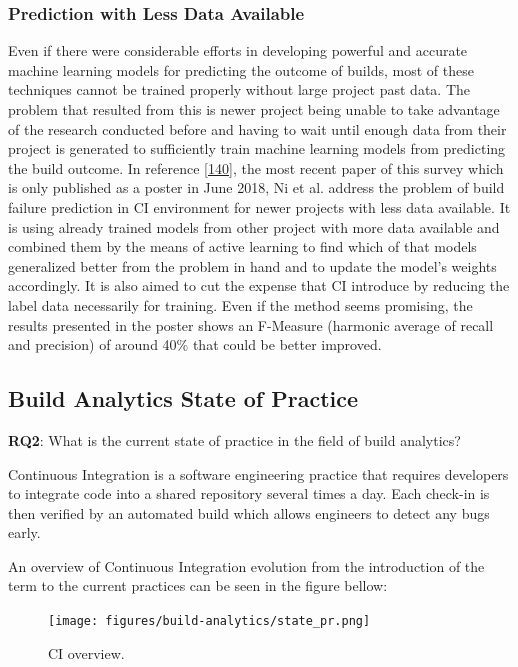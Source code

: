 \documentclass[]{book}
\begin{document}
\subsubsection{Prediction with Less Data
Available}\label{prediction-with-less-data-available}

Even if there were considerable efforts in developing powerful and
accurate machine learning models for predicting the outcome of builds,
most of these techniques cannot be trained properly without large
project past data. The problem that resulted from this is newer project
being unable to take advantage of the research conducted before and
having to wait until enough data from their project is generated to
sufficiently train machine learning models from predicting the build
outcome. In reference {[}\protect\hyperlink{ref-ni2018acona}{140}{]},
the most recent paper of this survey which is only published as a poster
in June 2018, Ni et al. address the problem of build failure prediction
in CI environment for newer projects with less data available. It is
using already trained models from other project with more data available
and combined them by the means of active learning to find which of that
models generalized better from the problem in hand and to update the
model's weights accordingly. It is also aimed to cut the expense that CI
introduce by reducing the label data necessarily for training. Even if
the method seems promising, the results presented in the poster shows an
F-Measure (harmonic average of recall and precision) of around 40\% that
could be better improved.

\subsection{Build Analytics State of
Practice}\label{build-analytics-state-of-practice}

\textbf{RQ2}: What is the current state of practice in the field of
build analytics?

Continuous Integration is a software engineering practice that requires
developers to integrate code into a shared repository several times a
day. Each check-in is then verified by an automated build which allows
engineers to detect any bugs early.

An overview of Continuous Integration evolution from the introduction of
the term to the current practices can be seen in the figure bellow:

\begin{figure}
\centering
\texttt{[image: figures/build-analytics/state\_pr.png]}
\caption{CI overview.}
\end{figure}
\end{document}
